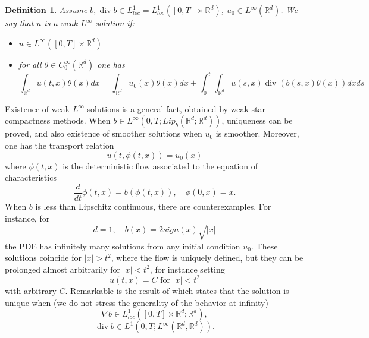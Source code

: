 \documentclass{article}
\newtheorem{definition}[theorem]{Definition}
\begin{document}
\begin{definition}
Assume $b,\operatorname{div}b\in L_{loc}^{1}
 = L_{loc}^{1} ([0,T] \times {\mathbb {R}}^d) $,
 $u_{0}\in L^{\infty}\left(
\mathbb{R}^{d}\right)  $. We say that $u$ is a weak
$L^{\infty}$-solution if:
\begin{itemize}
\item[i)] $u\in L^{\infty}\left(  \left[  0,T\right]  \times\mathbb{R}^{d}\right)  $
\item[ii)] for all $\theta\in C_{0}^{\infty}\left(  \mathbb{R}^{d}\right)  $ one has%
\[
\int_{{\mathbb R}^d}u\left(  t,x\right)  \theta\left(  x\right)
dx=\int_{{\mathbb R}^d}u_{0}\left( x\right)  \theta\left(  x\right)
dx+\int_{0}^{t}\int_{{\mathbb R}^d}u\left(  s,x\right)
\operatorname{div}\left( b\left(s,  x\right)  \theta\left(  x\right)
\right) dxds
\]
\end{itemize}
\end{definition}
Existence of weak $L^{\infty}$-solutions is a general fact, obtained
by weak-star compactness methods. When $b\in L^{\infty}\left(  0,T ;
Lip_b\left(  \mathbb{R}^{d};\mathbb{R}^{d}\right)  \right)  $,
uniqueness can be proved, and also existence of smoother solutions
when $u_{0}$ is smoother. Moreover, one has the transport relation
\[
u\left(  t,\phi\left(  t,x\right)  \right)  =u_{0}\left(  x\right)
\]
where $\phi\left(  t,x\right)  $ is the deterministic flow associated to the
equation of characteristics%
\[
\frac{d}{dt}\phi\left(  t,x\right)  =
 b\left(  \phi\left(  t,x\right)  \right)
,\quad\phi\left(  0,x\right)  =x.
\]
When $b$
is less than Lipschitz continuous, there are counterexamples. For
instance, for
\[
d=1,\quad b\left(  x\right)  =2sign\left(  x\right)  \sqrt{\left\vert
x\right\vert }%
\]
the PDE has infinitely many solutions from any initial condition $u_{0}$.
These solutions coincide for $\left\vert x\right\vert >t^{2}$, where the flow
is uniquely defined, but they can be prolonged almost arbitrarily for
$\left\vert x\right\vert <t^{2}$, for instance setting%
\[
u\left(  t,x\right)  =C\text{ for }\left\vert x\right\vert <t^{2}%
\]
with arbitrary $C$.
Remarkable is the result of \cite{DiPernaLions} which states that the solution
is unique when (we do not stress the generality of the behavior at infinity)%
\begin{equation}
\nabla b\in L_{loc}^{1}\left(  \left[  0,T\right]  \times\mathbb{R}^{d}%
;\mathbb{R}^{d}\right),  \label{weak diff}
\end{equation}%
\begin{equation}
\operatorname{div}b\in L^{1}\left(  0,T;L^{\infty}\left(  \mathbb{R}%
^{d},\mathbb{R}^{d}\right)  \right)  .\label{no compression}%
\end{equation}
\end{document}
